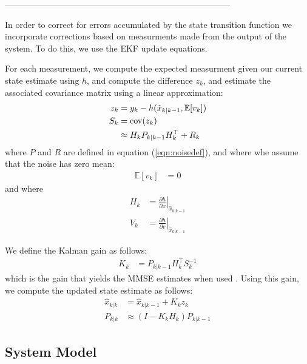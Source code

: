 \documentclass[]{article}
\begin{document}
{--------------------------------------------------------------------------------

In order to correct for errors accumulated by the state transition function we incorporate corrections based on measurments made from the output of the system. To do this, we use the \ac{EKF} update equations.

For each measurement, we compute the expected measurment given our current state estimate using $h$, and compute the difference $z_k$, and estimate the associated covariance matrix using a linear approximation:
\begin{align}
	z_k &= y_k - h(\hat{x}_{k|k-1}, \mathbb{E}[v_k]) \\
	S_k &= \operatorname{cov}(z_k) \notag \\
		&\approx H_k P_{k|k-1} H_k^\top + R_k
\end{align}
where $P$ and $R$ are defined in equation (\ref{eqn:noisedef}), and where whe assume that the noise has zero mean:
\begin{align}
	\mathbb{E}[v_k] &= 0
\end{align}
and where
\begin{align}
	H_{k} &= \left . \frac{\partial h}{\partial x} \right \vert _{\hat{x}_{k|k-1}} \\
	V_{k} &= \left . \frac{\partial h}{\partial v} \right \vert _{\hat{x}_{k|k-1}}
\end{align}

We define the Kalman gain as follows:
\begin{align}
	K_k &= P_{k|k-1} H_k^\top S_k^{-1}
\end{align}
which is the gain that yields the \ac{MMSE} estimates when used \cite{BerkelyCourse}. Using this gain, we compute the updated state estimate as follows:
\begin{align}
	\hat{x}_{k|k} 	&= \hat{x}_{k|k-1} + K_k z_k \\
	P_{k|k} 		&\approx (I - K_k H_k) P_{k|k-1}
\end{align}

\clearpage

\subsection{System Model} %
\label{sub:system_model}

}
\end{document}
